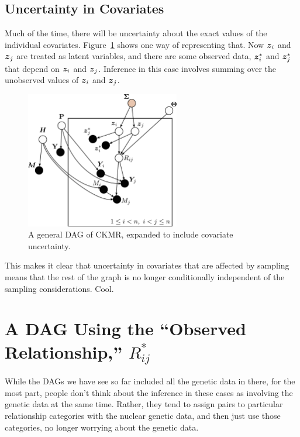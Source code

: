 \documentclass[11pt, oneside]{article}   	%
\def\bm#1{\mathpalette\bmstyle{#1}}
\def\bmstyle#1#2{\mbox{\boldmath$#1#2$}}
\newcommand{\bz}{\bm{z}}
\begin{document}
\subsection{Uncertainty in Covariates}

Much of the time, there will be uncertainty about the exact values of the individual covariates.  Figure~\ref{fig:covar-uncert}
shows one way of representing that.  Now $\bz_i$ and $\bz_j$ are treated as latent variables, and there are some observed data,
$\bz_i^*$ and $\bz_j^*$ that depend on $\bz_i$ and $\bz_j$.  Inference in this case involves summing over the unobserved
values of $\bz_i$ and $\bz_j$.
\begin{figure}
\begin{center}
\includegraphics[width=0.6\textwidth]{images/general-dag-2.pdf}
\end{center}
\caption{A general DAG of CKMR, expanded to include covariate uncertainty.}
\label{fig:covar-uncert}
\end{figure}
This makes it clear that uncertainty in covariates that are affected
by sampling means that the rest of the graph is no longer
conditionally independent of the sampling considerations.
Cool.  

\section{A DAG Using the ``Observed Relationship,'' $R_{ij}^*$}

While the DAGs we have see so far included all the genetic data in there, for the most part,
people don't think about the inference in these cases as involving the genetic data at the same
time.  Rather, they tend to assign pairs to particular relationship categories with the nuclear genetic
data, and then just use those categories, no longer worrying about the genetic data.
\end{document}
